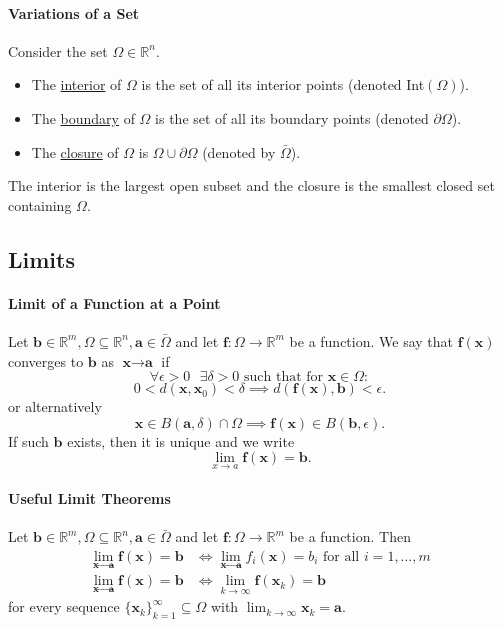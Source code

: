 \paragraph{Variations of a Set}
Consider the set \(\Omega \in \mathbb{R}^n\).
\begin{itemize}
    \item The \underline{interior} of \(\Omega\) is the set of all its interior points (denoted Int\((\Omega)\)).
    \item The \underline{boundary}  of \(\Omega\) is the set of all its boundary points (denoted \(\partial \Omega\)).
    \item The \underline{closure} of \(\Omega\) is \(\Omega \cup \partial \Omega\) (denoted by \(\bar{\Omega}\)).
\end{itemize}
The interior is the largest open subset and the closure is the smallest closed set containing \(\Omega\). \\

\subsection{Limits}
\paragraph{Limit of a Function at a Point} Let \(\textbf{b} \in \mathbb{R}^m, 
\Omega \subseteq \mathbb{R}^n, \textbf{a} \in \bar\Omega\) and let 
\(\textbf{f}: \Omega \rightarrow \mathbb{R}^m\) be a function. We say that 
\(\textbf{f}(\textbf{x})\) converges to \(\textbf{b}\) as \(\textbf{x}\to \textbf{a}\) if
\[\forall \epsilon > 0 \text{ } \exists \delta > 0 \text{ such that for } \textbf{x} \in \Omega:\]
\[0 < d(\textbf{x}, \textbf{x}_0) < \delta \implies 
d(\textbf{f}(\textbf{x}), \textbf{b}) < \epsilon.\]
or alternatively
\[\textbf{x} \in B(\textbf{a}, \delta) \cap \Omega \implies \textbf{f}(\textbf{x}) 
\in B(\textbf{b}, \epsilon).\]
If such \(\textbf{b}\) exists, then it is unique and we write 
\[\lim_{x\to a} \textbf{f}(\textbf{x}) = \textbf{b}.\]

\paragraph{Useful Limit Theorems}
Let \(\textbf{b} \in \mathbb{R}^m, \Omega \subseteq \mathbb{R}^n, \textbf{a} \in \bar\Omega\)
and let \(\textbf{f}:\Omega\rightarrow\mathbb{R}^m\) be a function. Then
\begin{align*}
    \lim_{\textbf{x}\to\textbf{a}} \textbf{f}(\textbf{x}) = \textbf{b} & \iff
    \lim_{\textbf{x}\to \textbf{a}}f_i(\textbf{x})=b_i \text{ for all } i=1,\dots,m \\
    \lim_{\textbf{x}\to \textbf{a}}\textbf{f}(\textbf{x}) = \textbf{b} & \iff
    \lim_{k\to\infty} \textbf{f}(\textbf{x}_k) = \textbf{b}
\end{align*}
for every sequence \(\{\textbf{x}_k\}_{k=1}^\infty \subseteq \Omega\) with 
\(\lim_{k \rightarrow\infty} \textbf{x}_k = \textbf{a}\). 

